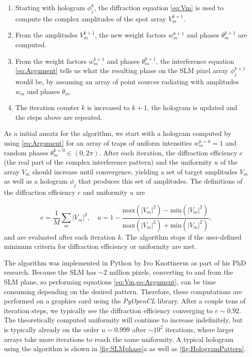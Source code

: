 \begin{enumerate}
    \item Starting with hologram $\phi_j^k$, the diffraction equation \cref{eq:Vm} is used to compute the complex amplitudes of the spot array $V_m^{k+1}$. 
    
    \item From the amplitudes $V_m^{k+1}$, the new weight factors $w_m^{k+1}$ and phases $\theta_m^{k+1}$ are computed.
    
    \item From the weight factors $w_m^{k+1}$ and phases $\theta_m^{k+1}$, the interference equation \cref{eq:Argument} tells us what the resulting phase on the SLM pixel array $\phi_j^{k+1}$ would be, by assuming an array of point sources radiating with amplitudes $w_m$ and phases $\theta_m$.
    
    \item The iteration counter $k$ is increased to $k+1$, the hologram is updated and the steps above are repeated.
\end{enumerate}
As a initial ansatz for the algorithm, we start with a hologram computed by using \cref{eq:Argument} for an array of traps of uniform intensities $w_m^{k=0} = 1$ and random phases $\theta_m^{k=0} \in (0, 2\pi)$.
After each iteration, the diffraction efficiency $e$ (the real part of the complex interference pattern) and the uniformity $u$ of the array $V_m$ should increase until convergence, yielding a set of target amplitudes $V_m$ as well as a hologram $\phi_j$ that produces this set of amplitudes.
The definitions of the diffraction efficiency $e$ and uniformity $u$ are 

\begin{equation}\label{eq:EfficiencyUniformity}
    e = \frac{1}{M}\sum_m |V_m|^2, 
    \quad 
    u = 1-\frac{\text{max}(|V_m|^2)-\text{min}(|V_m|^2)}{\text{max}(|V_m|^2)+\text{min}(|V_m|^2)},
\end{equation}
and are evaluated after each iteration $k$. 
The algorithm stops if the user-defined minimum criteria for diffraction efficiency or uniformity are met.

The algorithm was implemented in Python by Ivo Knottnerus as part of his PhD research.
Because the SLM has $\sim 2$ million pixels, converting to and from the SLM plane, so performing equations \cref{eq:Vm,eq:Argument}, can be time consuming depending on the desired pattern.
Therefore, these computations are performed on a graphics card using the \textit{PyOpenCL} library. 
After a couple tens of iteration steps, we typically see the diffraction efficiency converging to $e \sim 0.92$.
The theoretically computed uniformity will continue to increase indefinitely, but is typically already on the order $u \sim 0.999$ after $\sim 10^2$ iterations, where larger arrays take more iterations to reach the same uniformity.
A typical hologram using the algorithm is shown in \ref{fig:SLMphase}a as well as \ref{fig:HologramPattern}.


